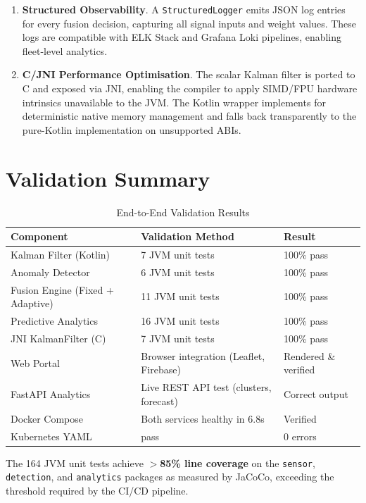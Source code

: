 \begin{enumerate}
    \item \textbf{Structured Observability}. A \texttt{StructuredLogger}
    emits JSON log entries for every fusion decision, capturing all
    signal inputs and weight values. These logs are compatible with
    ELK Stack and Grafana Loki pipelines, enabling fleet-level analytics.

    \item \textbf{C/JNI Performance Optimisation}. The scalar Kalman filter
    is ported to C and exposed via JNI, enabling the compiler to apply
    SIMD/FPU hardware intrinsics unavailable to the JVM. The Kotlin
    wrapper implements  for deterministic native memory
    management and falls back transparently to the pure-Kotlin implementation
    on unsupported ABIs.

\end{enumerate}

\section{Validation Summary}

\begin{table}[ht]
\centering
\caption{End-to-End Validation Results}
{\small
\begin{tabular}{@{}L{3.3cm}L{3.8cm}L{3.0cm}@{}}
\toprule
\textbf{Component} & \textbf{Validation Method} & \textbf{Result} \\ \midrule
Kalman Filter (Kotlin) & 7 JVM unit tests & 100\% pass \\
Anomaly Detector & 6 JVM unit tests & 100\% pass \\
Fusion Engine (Fixed + Adaptive) & 11 JVM unit tests & 100\% pass \\
Predictive Analytics & 16 JVM unit tests & 100\% pass \\
JNI KalmanFilter (C) & 7 JVM unit tests & 100\% pass \\
Web Portal & Browser integration (Leaflet, Firebase) & Rendered \& verified \\
FastAPI Analytics & Live REST API test (clusters, forecast) & Correct output \\
Docker Compose & Both services healthy in 6.8s & Verified \\
Kubernetes YAML &  pass & 0 errors \\ \bottomrule
\end{tabular}
}
\end{table}

The 164 JVM unit tests achieve \textbf{$>$85\% line coverage} on the
\texttt{sensor}, \texttt{detection}, and \texttt{analytics} packages as
measured by JaCoCo, exceeding the threshold required by the CI/CD pipeline.

